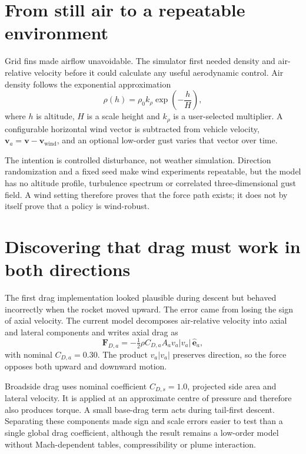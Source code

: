 \section{From still air to a repeatable environment}

Grid fins made airflow unavoidable. The simulator first needed density and air-relative
velocity before it could calculate any useful aerodynamic control. Air density follows the
exponential approximation
\begin{equation}
  \rho(h)=\rho_0 k_\rho \exp\!\left(-\frac{h}{H}\right),
  \label{eq:density}
\end{equation}
where $h$ is altitude, $H$ is a scale height and $k_\rho$ is a user-selected multiplier. A
configurable horizontal wind vector is subtracted from vehicle velocity,
$\mathbf v_a=\mathbf v-\mathbf v_{\mathrm{wind}}$, and an optional low-order gust varies that
vector over time.

The intention is controlled disturbance, not weather simulation. Direction randomization and a
fixed seed make wind experiments repeatable, but the model has no altitude profile, turbulence
spectrum or correlated three-dimensional gust field. A wind setting therefore proves that the
force path exists; it does not by itself prove that a policy is wind-robust.

\section{Discovering that drag must work in both directions}

The first drag implementation looked plausible during descent but behaved incorrectly when the
rocket moved upward. The error came from losing the sign of axial velocity. The current model
decomposes air-relative velocity into axial and lateral components and writes axial drag as
\begin{equation}
  \mathbf F_{D,a}=-\tfrac12\rho C_{D,a}A_a
  v_a\lvert v_a\rvert\,\hat{\mathbf e}_a,
  \label{eq:axialdrag}
\end{equation}
with nominal $C_{D,a}=0.30$. The product $v_a\lvert v_a\rvert$ preserves direction, so the force
opposes both upward and downward motion.

Broadside drag uses nominal coefficient $C_{D,s}=1.0$, projected side area and lateral velocity.
It is applied at an approximate centre of pressure and therefore also produces torque. A small
base-drag term acts during tail-first descent. Separating these components made sign and scale
errors easier to test than a single global drag coefficient, although the result remains a
low-order model without Mach-dependent tables, compressibility or plume interaction.

